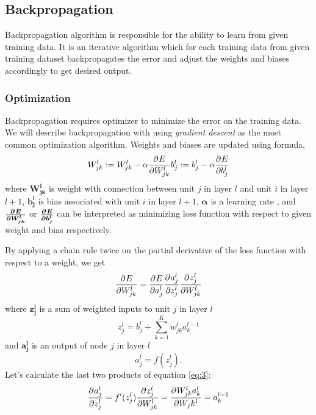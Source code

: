 \subsection{Backpropagation}

Backpropagation algorithm is responsible for the ability to learn from given training data.
It is an iterative algorithm which for each training data %
from given training dataset backpropagates the error and adjust the weights and biases accordingly to get desired output.

\subsubsection{Optimization}

Backpropagation requires optimizer to minimize the error on the training data.
We will describe backpropagation with using \textit{gradient descent} as the most common optimization algorithm.
\newline
Weights and biases are updated using formula,
\begin{equation} \label{eq:2}
	W_{jk}^l := W_{jk}^l - \alpha\frac{\partial^{} E}{\partial W_{jk}^l}
	b_j^l := b_j^l - \alpha\frac{\partial^{} E}{\partial b_j^l}
\end{equation}
where $\boldsymbol{W_{jk}^l}$ is weight with connection between unit $j$ in layer $l$ and unit $i$ in layer $l+1$, $\boldsymbol{b_j^l}$ is bias associated with unit
$i$ in layer $l+1$, $\boldsymbol{\alpha}$ is a learning rate \cite{learning_rate}, and $\boldsymbol{\frac{\partial^{} E}{\partial W_{jk}^l}}$ or $\boldsymbol{\frac{\partial^{} E}{\partial b_j^l}}$ can be interpreted as minimizing loss function with respect to given weight and bias respectively.
\par
By applying a chain rule twice on the partial derivative of the loss function with respect to a weight, we get
\begin{equation} \label{eq:3}
  \frac{\partial^{} E}{\partial W_{jk}^l} = \frac{\partial^{} E}{\partial a_j^l}\frac{\partial^{} a_j^l}{\partial z_j^l}\frac{\partial^{} z_j^l}{\partial W_{jk}^l}
\end{equation}
where $\boldsymbol{z_j^l}$ is a sum of weighted inputs to unit $j$ in layer $l$
\begin{equation} \label{eq:4}
	z_j^l =  b_j^l + \sum_{k=1}^K {w_{jk}^l}{a_k^{l-1}}
\end{equation}
and $\boldsymbol{a_j^l}$ is an output of node $j$ in layer $l$
\begin{equation} \label{eq:5}
	a_j^l =  f(z_j^l).
\end{equation}
Let's calculate the last two products of equation \ref{eq:3}:
\begin{equation} \label{eq:6}
	\frac{\partial^{} a_j^l}{\partial z_j^l} = f'(z_j^l)
	\frac{\partial^{} z_j^l}{\partial W_{jk}^l} = \frac{\partial^{} W_{jk}^{l}a_k^{l}}{\partial W_jk^l} = a_k^{l-1}
\end{equation}

